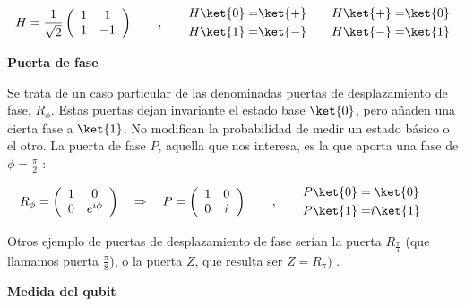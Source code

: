 \documentclass[11pt,a4paper,twoside,pdf]{article}
\numberwithin{equation}{section}
\begin{document}
				\begin{equation}\label{eq: Hadamard}
					H = \frac{1}{\sqrt{2}}\left(\begin{array}{cc}1 &  1\\1 & -1\end{array}\right)		\qquad , \qquad
					\begin{aligned}H\ket{0} =& \ket{+}\\H\ket{1}=& \ket{-}\end{aligned}	\qquad
					\begin{aligned}H\ket{+}=& \ket{0}\\H\ket{-}=& \ket{1}\end{aligned}
				\end{equation}	
			
		\begin{flushleft}{\textbf{Puerta de fase}}\end{flushleft}	
			
			Se trata de un caso particular de las denominadas puertas de desplazamiento de fase, $R_{\phi}$. Estas puertas dejan invariante el estado base $\ket{0}$, pero añaden una cierta fase a $\ket{1}$. No modifican la probabilidad de medir un estado básico o el otro.
			La puerta de fase $P$, aquella que nos interesa, es la que aporta una fase de $\phi=\frac{\pi}{2}$ :
			
				\begin{equation}\label{eq: Fase}
					R_{\phi} = \left(\begin{array}{cc}1 &  0\\0 & e^{i\phi}\end{array}\right)	\quad \Rightarrow \quad
					P = \left(\begin{array}{cc}1 &  0\\0 & i\end{array}\right)				 \qquad , \qquad
					\begin{aligned} P\ket{0}=& \; \ket{0} \\ P\ket{1}=& i\ket{1}\end{aligned} \qquad
				\end{equation}		
				
			Otros ejemplo de puertas de desplazamiento de fase serían la puerta $R_{\frac{\pi}{4}}$ (que llamamos puerta $\frac{\pi}{8}$), o la puerta $Z$, que resulta ser $Z=R_{\pi})$ .	
			
		\begin{flushleft}{\textbf{Medida del qubit }}\end{flushleft}	
		
\end{document}
